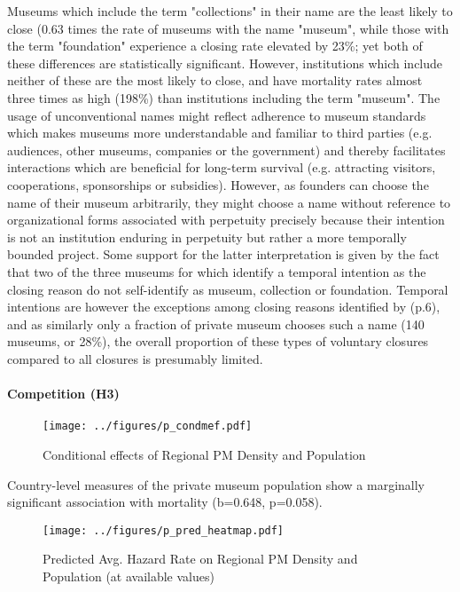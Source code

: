 \documentclass[12pt]{article}
\begin{document}
Museums which include the term "collections" in their name are the least likely to close (0.63 times the rate of museums with the name "museum", while those with the term "foundation" experience a closing rate elevated by 23\%; yet both of these differences are statistically significant.
However, institutions which include neither of these are the most likely to close, and have mortality rates almost three times as high (198\%) than institutions including the term "museum".
The usage of unconventional names might reflect adherence to museum standards which makes museums more understandable and familiar to third parties (e.g. audiences, other museums, companies or the government) and thereby facilitates interactions which are beneficial for long-term survival (e.g. attracting visitors, cooperations, sponsorships or subsidies).
However, as founders can choose the name of their museum arbitrarily, they might choose a name without reference to organizational forms associated with perpetuity precisely because their intention is not an institution enduring in perpetuity but rather a more temporally bounded project.
Some support for the latter interpretation is given by the fact that two of the three museums for which \textcite{Velthuis_Gera_2024_fragility} identify a temporal intention as the closing reason do not self-identify as museum, collection or foundation.
Temporal intentions are however the exceptions among closing reasons identified by \textcite{Velthuis_Gera_2024_fragility} (p.6), and as similarly only a fraction of private museum chooses such a name (140 museums, or 28\%), the overall proportion of these types of voluntary closures compared to all closures is presumably limited.
\paragraph*{Competition (H3)}


\begin{figure}[htbp]
\centering
\texttt{[image: ../figures/p\_condmef.pdf]}
\caption{\label{fig:p_condmef}Conditional effects of Regional PM Density and Population}
\end{figure}


Country-level measures of the private museum population show a marginally significant association with mortality (b=0.648, p=0.058).
\begin{figure}[htbp]
\centering
\texttt{[image: ../figures/p\_pred\_heatmap.pdf]}
\caption{\label{fig:p_pred_heatmap}Predicted Avg. Hazard Rate on Regional PM Density and Population (at available values)}
\end{figure}
\end{document}
